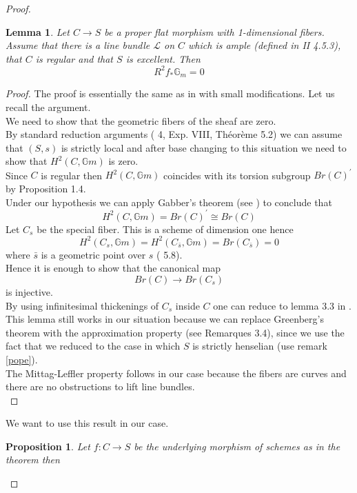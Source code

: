 \documentclass{amsart}
\newtheorem{prop}[thm]{Proposition}
\newtheorem{lm}[thm]{Lemma}
\theoremstyle{definition}
\numberwithin{equation}{section}
\begin{document}
\begin{proof}
\begin{lm}\label{stredarg}
    Let $C{\rightarrow} S$ be a proper flat morphism with 1-dimensional fibers. Assume that there is a line bundle $\mathcal{L}$ on $C$ which is ample (defined in \cite{ega} II 4.5.3), that $C$ is regular and that $S$ is excellent. Then
  $$
  R^2f_{*}\mathbb{G}_m=0
  $$
\end{lm}
\begin{proof}
The proof is essentially the same as in \cite{br3} with small modifications. Let us recall the argument.\\
We need to show that the geometric fibers of the sheaf are zero. \\
By standard reduction arguments (\cite{sga} 4, Exp. VIII, Th\'eor\`eme 5.2) we can assume that $(S,s)$ is strictly local and after base changing to this situation we need to show that $H^2(C,{\mathbb{G}m})$ is zero.\\
Since $C$ is regular then $H^2(C,{\mathbb{G}m})$ coincides with its torsion subgroup $Br(C)^{\prime}$ by \cite{br2} Proposition 1.4.\\ 
Under our hypothesis we can apply Gabber's theorem (see \cite{gabber} ) to conclude that
$$
H^2(C,{\mathbb{G}m})=Br(C)^{\prime}\cong Br(C)
$$
\noindent
Let $C_s$ be the special fiber. This is a scheme of dimension one hence 
$$
H^2(C_s,{\mathbb{G}m})=H^2(C_{\bar{s}},{\mathbb{G}m})=Br(C_{\bar{s}})=0
$$
\noindent where $\bar{s}$ is a geometric point over $s$ (\cite{br3} 5.8). \\
Hence it is enough to show that the canonical map
$$
Br(C){\rightarrow} Br(C_s)
$$
\noindent is injective.\\
By using infinitesimal thickenings of $C_s$ inside $C$ one can reduce to lemma 3.3 in \cite{br3}. \\
This lemma still works in our situation because we can replace Greenberg's theorem with the approximation property (see \cite{br3} Remarques 3.4), since we use the fact that we reduced to the case in which $S$ is strictly henselian (use remark \ref{pope}).  \\
The Mittag-Leffler property follows in our case because the fibers are curves and there are no obstructions to lift line bundles.\\ 
\end{proof}
\noindent We want to use this result in our case.\\
\begin{prop}\label{r2zero}
Let $f:C{\rightarrow} S$ be the underlying morphism of schemes as in the theorem then

\end{prop}
\end{proof}
\end{document}
